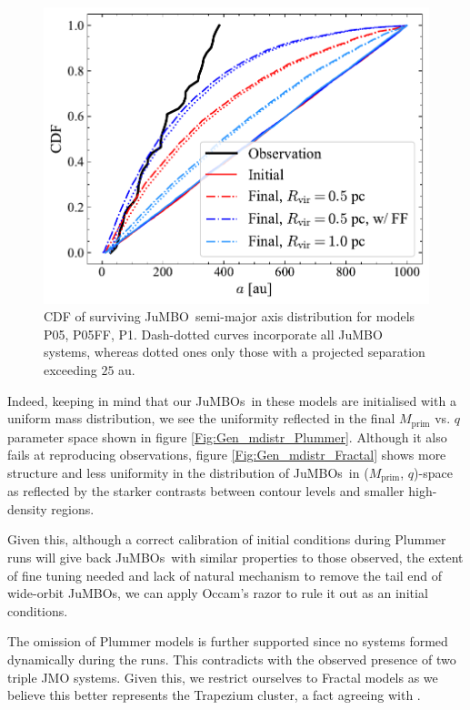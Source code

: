 \documentclass[aa]{lib/aa}
\newcommand{\jumbo}{\mbox{JuMBO}}
\newcommand{\jumbos}{\mbox{JuMBOs}}
\begin{document}
   \begin{figure}
    \centering
        \includegraphics[width=\columnwidth]{figures/Plummer_General_sem_axis.pdf}
        \caption{CDF of surviving \jumbo\, semi-major axis distribution for models P05, P05FF, P1. Dash-dotted curves incorporate all \jumbo\, systems, whereas dotted ones only those with a projected separation exceeding $25$ au.}
         \label{Fig:Gen_Semi_Plummer}
   \end{figure}

    Indeed, keeping in mind that our \jumbos\, in these models are initialised with a uniform mass distribution, we see the uniformity reflected in the final $M_{\mathrm{prim}}$ vs. $q$ parameter space shown in figure \ref{Fig:Gen_mdistr_Plummer}. Although it also fails at reproducing observations, figure \ref{Fig:Gen_mdistr_Fractal} shows more structure and less uniformity in the distribution of \jumbos\, in ($M_{\mathrm{prim}}$, $q$)-space as reflected by the starker contrasts between contour levels and smaller high-density regions.
    
    Given this, although a correct calibration of initial conditions during Plummer runs will give back \jumbos\, with similar properties to those observed, the extent of fine tuning needed and lack of natural mechanism to remove the tail end of wide-orbit JuMBOs, we can apply Occam's razor to rule it out as an initial conditions. 
    
    The omission of Plummer models is further supported since no systems formed dynamically during the runs. This contradicts with the observed presence of two triple JMO systems. Given this, we restrict ourselves to Fractal models as we believe this better represents the Trapezium cluster, a fact agreeing with \citet{2016MNRAS.457..313P}.
   
\end{document}

